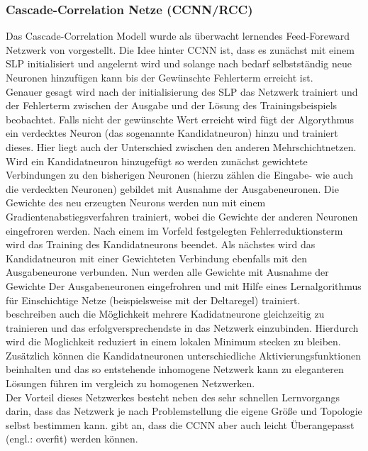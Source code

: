 

\subsubsection{Cascade-Correlation Netze (CCNN/RCC)}%

Das Cascade-Correlation Modell wurde als überwacht lernendes Feed-Foreward Netzwerk von \citet{Fahlman1990} vorgestellt. Die Idee hinter CCNN ist, dass es zunächst mit einem SLP initialisiert und angelernt wird und solange nach bedarf selbstständig neue Neuronen hinzufügen kann bis der Gewünschte Fehlerterm erreicht ist.\\
Genauer gesagt wird nach der initialisierung des SLP das Netzwerk trainiert und der Fehlerterm zwischen der Ausgabe und der Lösung des Trainingsbeispiels beobachtet. Falls nicht der gewünschte Wert erreicht wird fügt der Algorythmus ein verdecktes Neuron (das sogenannte Kandidatneuron) hinzu und trainiert dieses. Hier liegt auch der Unterschied zwischen den anderen Mehrschichtnetzen. Wird ein Kandidatneuron hinzugefügt so werden zunächst gewichtete Verbindungen zu den bisherigen Neuronen (hierzu zählen die Eingabe- wie auch die verdeckten Neuronen) gebildet mit Ausnahme der Ausgabeneuronen. Die Gewichte des neu erzeugten Neurons werden nun mit einem Gradientenabstiegsverfahren trainiert, wobei die Gewichte der anderen Neuronen eingefroren werden. Nach einem im Vorfeld festgelegten Fehlerreduktionsterm wird das Training des Kandidatneurons beendet. Als nächstes wird das Kandidatneuron mit einer Gewichteten Verbindung ebenfalls mit den Ausgabeneurone verbunden. Nun werden alle Gewichte mit Ausnahme der Gewichte Der Ausgabeneuronen eingefrohren und mit Hilfe eines Lernalgorithmus für Einschichtige Netze (beispielsweise mit der Deltaregel) trainiert.\\
\citet{Fahlman1990} beschreiben auch die Möglichkeit mehrere Kadidatneurone gleichzeitig zu trainieren und das erfolgversprechendste in das Netzwerk einzubinden. Hierdurch wird die Moglichkeit reduziert in einem lokalen Minimum stecken zu bleiben. Zusätzlich können die Kandidatneuronen unterschiedliche Aktivierungsfunktionen beinhalten und das so entstehende inhomogene Netzwerk kann zu eleganteren Lösungen führen im vergleich zu homogenen Netzwerken.\\
Der Vorteil dieses Netzwerkes besteht neben des sehr schnellen Lernvorgangs darin, dass das Netzwerk je nach Problemstellung die eigene Größe und Topologie selbst bestimmen kann. \citet{Balazs2009} gibt an, dass die CCNN aber auch leicht Überangepasst (engl.: overfit) werden können.\\
